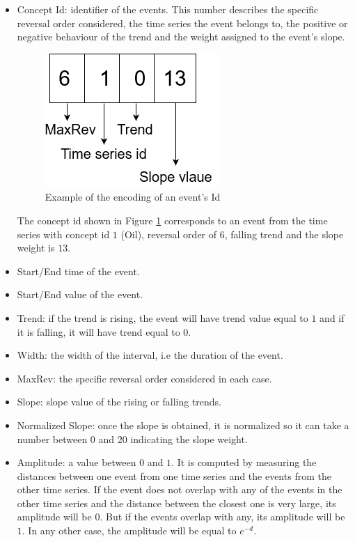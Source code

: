 \documentclass[a4, 11pt]{article}
\begin{document}
\begin{itemize}
    \item Concept Id: identifier of the events. This number describes the specific reversal order considered, the time series the event belongs to, the positive or negative behaviour of the trend and the weight assigned to the event's slope. 
           \begin{figure}[!ht]
           \centering
           \includegraphics[scale=0.5]{Images/id.png}
           \caption{Example of the encoding of an event's Id}
           \label{fig:id}
       \end{figure}
        The concept id shown in Figure \ref{fig:id} corresponds to an event from the time series with concept id $1$ (Oil), reversal order of $6$, falling trend and the slope weight is $13$. 
    \item Start/End time of the event.
    \item Start/End value of the event. 
    \item Trend: if the trend is rising, the event will have trend value equal to $1$ and if it is falling, it will have trend equal to $0$.
    \item Width: the width of the interval, i.e the duration of the event.  
    \item MaxRev: the specific reversal order considered in each case.
    \item Slope: slope value of the rising or falling trends. 
    \item Normalized Slope: once the slope is obtained, it is normalized so it can take a number between 0 and 20 indicating the slope weight. 
    \item Amplitude: a value between $0$ and $1$. It is computed by measuring the distances between one event from one time series and the events from the other time series. If the event does not overlap with any of the events in the other time series and the distance between the closest one is very large, its amplitude will be 0. But if the events overlap with any, its amplitude will be $1$. In any other case, the amplitude will be equal to $e^{-d}$.
\end{itemize}
\end{document}
